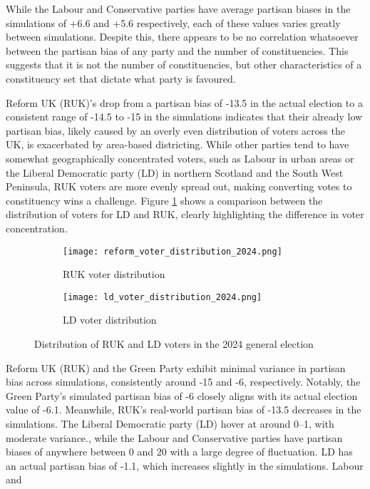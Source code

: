 \documentclass{article}
\begin{document}
While the Labour and Conservative parties have average partisan biases in the simulations of +6.6 and +5.6 respectively, each of these values varies greatly between simulations. 
Despite this, there appears to be no correlation whatsoever between the partisan bias of any party and the number of constituencies. This suggests that it is not the number of constituencies,
but other characteristics of a constituency set that dictate what party is favoured.


Reform UK (RUK)'s drop from a partisan bias of -13.5 in the actual election to a consistent range of -14.5 to -15 in the simulations indicates that their already low partisan bias, likely caused by an overly even distribution
of voters across the UK, is exacerbated by area-based districting. While other parties tend to have somewhat geographically concentrated voters, such as Labour in urban areas or the Liberal Democratic party (LD)
in northern Scotland and the South West Peninsula, RUK voters are more evenly spread out, making converting votes to constituency wins a challenge. Figure \ref{fig:ld_ruk_distribution_2024} shows a comparison between the distribution of voters for 
LD and RUK, clearly highlighting the difference in voter concentration.

\begin{figure}[H]
    \centering
    \begin{subfigure}{0.3\textwidth}
        \centering
        \texttt{[image: reform\_voter\_distribution\_2024.png]}
        \caption{RUK voter distribution}
    \end{subfigure}
    \begin{subfigure}{0.3\textwidth}
        \centering
        \texttt{[image: ld\_voter\_distribution\_2024.png]}
        \caption{LD voter distribution}
    \end{subfigure}
    \caption{Distribution of RUK and LD voters in the 2024 general election \cite{voter_distribution_2024}}
    \label{fig:ld_ruk_distribution_2024}
\end{figure}


Reform UK (RUK) and the Green Party exhibit minimal variance in partisan bias across simulations, consistently around -15 and -6, respectively. 
Notably, the Green Party's simulated partisan bias of -6 closely aligns with its actual election value of -6.1. Meanwhile, RUK's real-world partisan bias of -13.5 decreases
in the simulations. The Liberal Democratic party (LD) hover at around 0--1, with moderate variance., while the Labour and Conservative parties have partisan biases of anywhere between 0 and 20 with 
a large degree of fluctuation. LD has an actual partisan bias of -1.1, which increases slightly in the simulations. Labour and 
\end{document}
